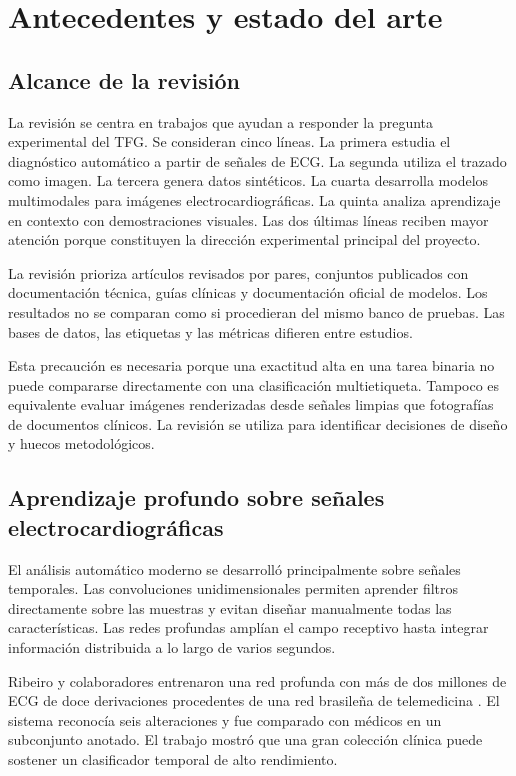 \chapter{Antecedentes y estado del arte}
\label{chap:relacionados}

\section{Alcance de la revisión}

La revisión se centra en trabajos que ayudan a responder la pregunta experimental del TFG. Se consideran cinco líneas. La primera estudia el diagnóstico automático a partir de señales de ECG. La segunda utiliza el trazado como imagen. La tercera genera datos sintéticos. La cuarta desarrolla modelos multimodales para imágenes electrocardiográficas. La quinta analiza aprendizaje en contexto con demostraciones visuales. Las dos últimas líneas reciben mayor atención porque constituyen la dirección experimental principal del proyecto.

La revisión prioriza artículos revisados por pares, conjuntos publicados con documentación técnica, guías clínicas y documentación oficial de modelos. Los resultados no se comparan como si procedieran del mismo banco de pruebas. Las bases de datos, las etiquetas y las métricas difieren entre estudios.

Esta precaución es necesaria porque una exactitud alta en una tarea binaria no puede compararse directamente con una clasificación multietiqueta. Tampoco es equivalente evaluar imágenes renderizadas desde señales limpias que fotografías de documentos clínicos. La revisión se utiliza para identificar decisiones de diseño y huecos metodológicos.

\section{Aprendizaje profundo sobre señales electrocardiográficas}

El análisis automático moderno se desarrolló principalmente sobre señales temporales. Las convoluciones unidimensionales permiten aprender filtros directamente sobre las muestras y evitan diseñar manualmente todas las características. Las redes profundas amplían el campo receptivo hasta integrar información distribuida a lo largo de varios segundos.

Ribeiro y colaboradores entrenaron una red profunda con más de dos millones de ECG de doce derivaciones procedentes de una red brasileña de telemedicina \cite{ribeiro2020}. El sistema reconocía seis alteraciones y fue comparado con médicos en un subconjunto anotado. El trabajo mostró que una gran colección clínica puede sostener un clasificador temporal de alto rendimiento.


